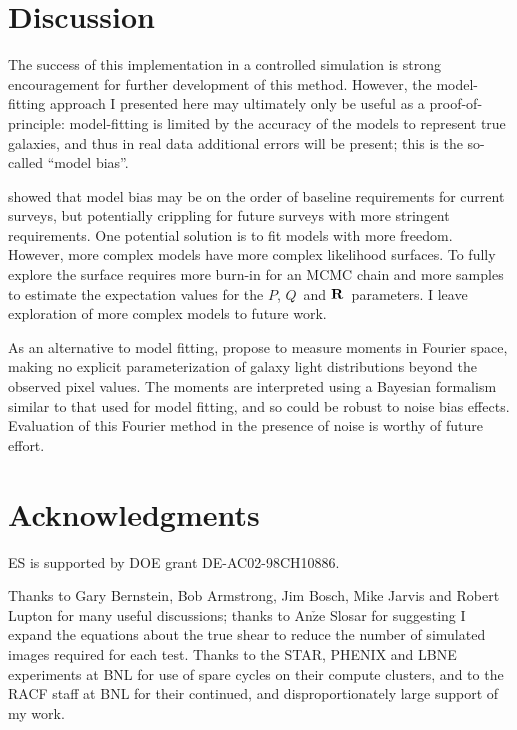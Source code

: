 \documentclass[usegraphicx,usenatbib]{mn2e}
\newcommand{\vecQ}{\mbox{\boldmath $Q$}}
\newcommand{\matR}{\mbox{$\bf R$}}
\begin{document}
\section{Discussion} \label{sec:summary}

The success of this implementation in a controlled simulation is strong
encouragement for further development of this method.  However, the
model-fitting approach I presented here may ultimately only be useful as a
proof-of-principle: model-fitting is limited by the accuracy of the models to
represent true galaxies, and thus in real data additional errors will be
present; this is the so-called ``model bias''.  

\cite{Kacprzak13} showed that model bias may be on the order of baseline
requirements for current surveys, but potentially crippling for future surveys
with more stringent requirements. One potential solution is to fit models with
more freedom.  However, more complex models have more complex likelihood
surfaces. To fully explore the surface requires more burn-in for an MCMC chain
and more samples to estimate the expectation values for the $P$, \vecQ\ and
\matR\ parameters.  I leave exploration of more complex models to future work.

As an alternative to model fitting, \cite{ba14} propose to measure moments in
Fourier space, making no explicit parameterization of galaxy light
distributions beyond the observed pixel values.  The moments are interpreted
using a Bayesian formalism similar to that used for model fitting, and so could
be robust to noise bias effects.  Evaluation of this Fourier method in the
presence of noise is worthy of future effort.

\section*{Acknowledgments}

ES is supported by DOE grant DE-AC02-98CH10886.

Thanks to Gary Bernstein, Bob Armstrong, Jim Bosch, Mike Jarvis and Robert
Lupton for many useful discussions; thanks to An$\check{\textrm{z}}$e Slosar for
suggesting I expand the equations about the true shear to reduce the number of
simulated images required for each test.  Thanks to the STAR, PHENIX and LBNE
experiments at BNL for use of spare cycles on their compute clusters, and to
the RACF staff at BNL for their continued, and disproportionately large support
of my work.




\end{document}
